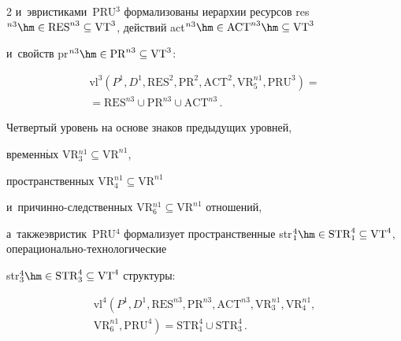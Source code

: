 \begin{multicols}{2}
и~эвристиками~PRU$^3$ формализованы иерархии ресурсов res$^{n3}\hm\in 


\mathrm{RES}^{n3}\subseteq \mathrm{VT}^3$, действий act$^{n3}\hm\in \mathrm{ACT}^{n3}


\hm\subseteq \mathrm{VT}^3$ 


и~свойств pr$^{n3}\hm\in \mathrm{PR}^{n3}\subseteq \mathrm{VT}^3$:


  \begin{multline*}


  \mathrm{vl}^3\!\left(P^1, D^1, \mathrm{RES}^2, 


  \mathrm{PR}^2, \mathrm{ACT}^2, \mathrm{VR}_5^{n1}, \mathrm{PRU}^3\right) = {}\\


  {}=


\mathrm{RES}^{n3}\cup \mathrm{PR}^{n3}\cup \mathrm{ACT}^{n3}\,.


\end{multline*}


    


  Четвертый уровень на основе знаков предыду\-щих уровней, 


временн$\acute{\mbox{ы}}$х VR$_3^{n1}\subseteq \mathrm{VR}^{n1}$, 


про\-странственных VR$_4^{n1}\subseteq \mathrm{VR}^{n1}$  


и~при\-чин\-но-след\-ст\-вен\-ных VR$_6^{n1}\subseteq \mathrm{VR}^{n1}$ отношений, 


а~также\linebreak эвристик~PRU$^4$ формализует пространственные str$_1^4\hm\in 


\mathrm{STR}_1^4\subseteq \mathrm{VT}^4$, опе\-ра\-ци\-о\-наль\-но-тех\-но\-ло\-ги\-че\-ские 


str$_3^4\hm\in \mathrm{STR}_3^4\subseteq \mathrm{VT}^4$ структуры:


  \begin{multline*}


  \mathrm{vl}^4\!\left( P^1, D^1, \mathrm{RES}^{n3}, \mathrm{PR}^{n3}, 


  \mathrm{ACT}^{n3}, \mathrm{VR}_3^{n1}, \mathrm{VR}_4^{n1},\right.\\


\left.  \mathrm{VR}_6^{n1}, \mathrm{PRU}^4\right) = \mathrm{STR}_1^4\cup \mathrm{STR}_3^4\,.


\end{multline*}



\end{multicols}
